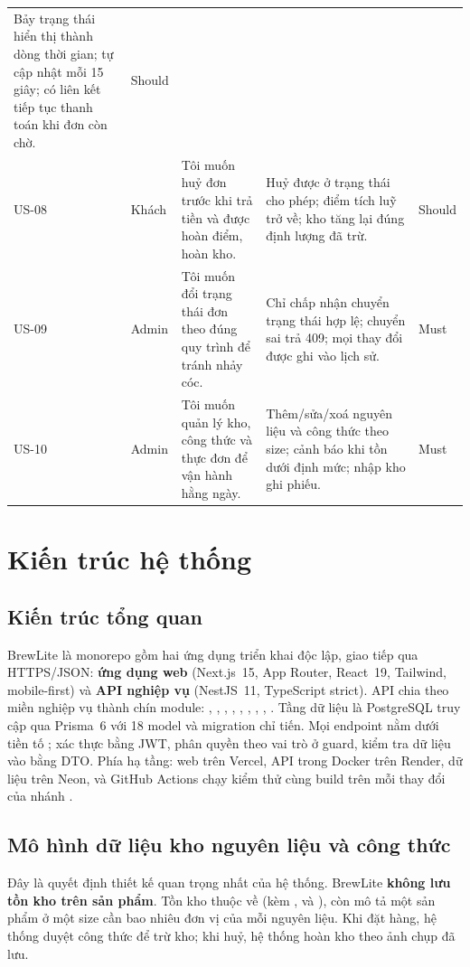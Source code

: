 ﻿\documentclass[12pt,a4paper]{article}
\begin{document}
\begin{longtable}{@{}p{0.95cm} p{1.5cm} p{5.0cm} p{6.4cm} p{1.2cm}@{}}
Bảy trạng thái hiển thị thành dòng thời gian; tự cập nhật mỗi 15 giây; có liên kết tiếp tục thanh
toán khi đơn còn chờ. & Should \\
US-08 & Khách & Tôi muốn huỷ đơn trước khi trả tiền và được hoàn điểm, hoàn kho. &
Huỷ được ở trạng thái cho phép; điểm tích luỹ trở về; kho tăng lại đúng định lượng đã trừ. & Should \\
US-09 & Admin & Tôi muốn đổi trạng thái đơn theo đúng quy trình để tránh nhảy cóc. &
Chỉ chấp nhận chuyển trạng thái hợp lệ; chuyển sai trả 409; mọi thay đổi được ghi vào lịch sử. & Must \\
US-10 & Admin & Tôi muốn quản lý kho, công thức và thực đơn để vận hành hằng ngày. &
Thêm/sửa/xoá nguyên liệu và công thức theo size; cảnh báo khi tồn dưới định mức; nhập kho ghi phiếu. & Must \\
\bottomrule
\end{longtable}
\endgroup

\section{Kiến trúc hệ thống}

\subsection{Kiến trúc tổng quan}
BrewLite là monorepo gồm hai ứng dụng triển khai độc lập, giao tiếp qua HTTPS/JSON: \textbf{ứng dụng
web} (Next.js~15, App Router, React~19, Tailwind, mobile-first) và \textbf{API nghiệp vụ} (NestJS~11,
TypeScript strict). API chia theo miền nghiệp vụ thành chín module: , ,
, , , , ,
, . Tầng dữ liệu là PostgreSQL truy cập qua Prisma~6 với 18 model và
migration chỉ tiến. Mọi endpoint nằm dưới tiền tố ; xác thực bằng JWT, phân quyền theo
vai trò ở guard, kiểm tra dữ liệu vào bằng DTO. Phía hạ tầng: web trên Vercel, API trong Docker trên
Render, dữ liệu trên Neon, và GitHub Actions chạy kiểm thử cùng build trên mỗi thay đổi của nhánh
.

\subsection{Mô hình dữ liệu kho nguyên liệu và công thức}
\label{sec:model}

Đây là quyết định thiết kế quan trọng nhất của hệ thống. BrewLite \textbf{không lưu tồn kho trên sản
phẩm}. Tồn kho thuộc về  (kèm ,  và ),
còn  mô tả một sản phẩm ở một size cần bao nhiêu đơn vị của mỗi nguyên liệu.
Khi đặt hàng, hệ thống duyệt công thức để trừ kho; khi huỷ, hệ thống hoàn kho theo ảnh chụp
 đã lưu.
\end{document}
